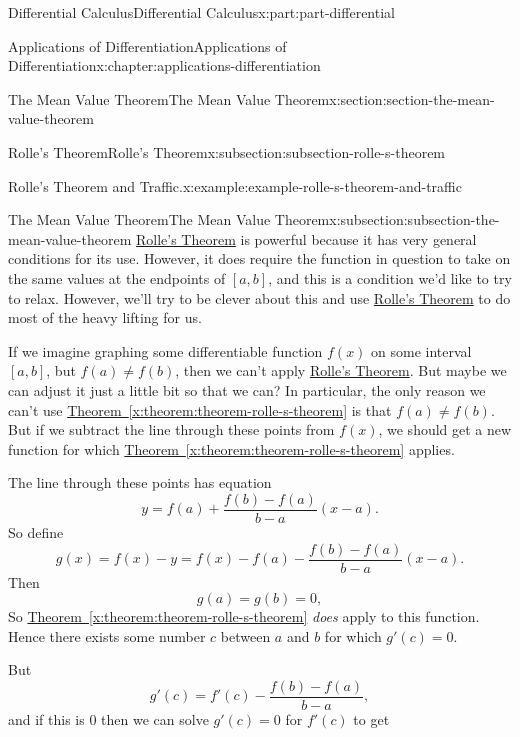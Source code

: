 \documentclass[twoside,10pt,]{book}
\newcommand{\xreffont}{\relax}
\numberwithin{equation}{part}
\begin{document}
\begin{partptx}{Differential Calculus}{}{Differential Calculus}{}{}{x:part:part-differential}
\begin{chapterptx}{Applications of Differentiation}{}{Applications of Differentiation}{}{}{x:chapter:applications-differentiation}
\begin{sectionptx}{The Mean Value Theorem}{}{The Mean Value Theorem}{}{}{x:section:section-the-mean-value-theorem}
\begin{subsectionptx}{Rolle's Theorem}{}{Rolle's Theorem}{}{}{x:subsection:subsection-rolle-s-theorem}
\begin{example}{Rolle's Theorem and Traffic.}{x:example:example-rolle-s-theorem-and-traffic}
\end{example}
\end{subsectionptx}
%
%
\typeout{************************************************}
\typeout{************************************************}
%
\begin{subsectionptx}{The Mean Value Theorem}{}{The Mean Value Theorem}{}{}{x:subsection:subsection-the-mean-value-theorem}
\hyperref[x:theorem:theorem-rolle-s-theorem]{Rolle's Theorem} is powerful because it has very general conditions for its use. However, it does require the function in question to take on the same values at the endpoints of \([a,b]\), and this is a condition we'd like to try to relax. However, we'll try to be clever about this and use \hyperref[x:theorem:theorem-rolle-s-theorem]{Rolle's Theorem} to do most of the heavy lifting for us.%
\par
If we imagine graphing some differentiable function \(f(x)\) on some interval \([a,b]\), but \(f(a)\neq f(b)\), then we can't apply \hyperref[x:theorem:theorem-rolle-s-theorem]{Rolle's Theorem}. But maybe we can adjust it just a little bit so that we can? In particular, the only reason we can't use \hyperref[x:theorem:theorem-rolle-s-theorem]{Theorem~{\xreffont\ref{x:theorem:theorem-rolle-s-theorem}}} is that \(f(a)\neq f(b)\). But if we subtract the line through these points from \(f(x)\), we should get a new function for which \hyperref[x:theorem:theorem-rolle-s-theorem]{Theorem~{\xreffont\ref{x:theorem:theorem-rolle-s-theorem}}} applies.%
\par
The line through these points has equation%
\begin{equation*}
y = f(a) + \frac{f(b) - f(a)}{b-a}(x-a).
\end{equation*}
So define%
\begin{equation*}
g(x) = f(x) - y = f(x) - f(a) - \frac{f(b) - f(a)}{b-a}(x-a).
\end{equation*}
Then%
\begin{equation*}
g(a) = g(b) = 0,
\end{equation*}
So \hyperref[x:theorem:theorem-rolle-s-theorem]{Theorem~{\xreffont\ref{x:theorem:theorem-rolle-s-theorem}}} \emph{does} apply to this function. Hence there exists some number \(c\) between \(a\) and \(b\) for which \(g'(c) = 0\).%
\par
But%
\begin{equation*}
g'(c) = f'(c) - \frac{f(b) - f(a)}{b-a},
\end{equation*}
and if this is \(0\) then we can solve \(g'(c) = 0\) for \(f'(c)\) to get%

\end{subsectionptx}
\end{sectionptx}
\end{chapterptx}
\end{partptx}
\end{document}
